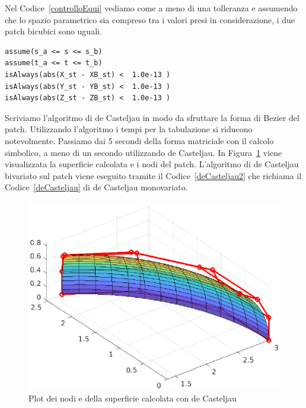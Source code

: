 \documentclass[12pt]{article}
\begin{document}
Nel Codice~\ref{controlloEqui} vediamo come a meno di una tolleranza e assumendo che lo spazio
parametrico sia compreso tra i valori presi in considerazione, i due patch bicubici sono uguali.
\begin{lstlisting}[caption={Controllo di equivalenza tra i due patch}, style=matlab, label={controlloEqui}, captionpos=b]
assume(s_a <= s <= s_b)
assume(t_a <= t <= t_b)
isAlways(abs(X_st - XB_st) <  1.0e-13 )
isAlways(abs(Y_st - YB_st) <  1.0e-13 )
isAlways(abs(Z_st - ZB_st) <  1.0e-13 )
\end{lstlisting}
Scriviamo l'algoritmo di de Casteljau in modo da sfruttare la forma di Bezier del patch. 
Utilizzando l'algoritmo i tempi per la tabulazione si riducono notevolmente. 
Passiamo dai 5 secondi della forma matriciale con il calcolo simbolico, a meno di un secondo
utilizzando de Casteljau. In Figura~\ref{fig:5} viene visualizzata la superficie calcolata
e i nodi del patch. L'algoritmo di de Casteljau bivariato sul patch viene eseguito tramite il 
Codice~\ref{deCasteljau2} che richiama il Codice~\ref{deCasteljau} di de Casteljau monovariato.
\begin{figure}[H]
    \centering

    \includegraphics[scale=0.7]{img/deCasteljauPatch.eps}

    \caption{Plot dei nodi e della superficie calcolata con de Casteljau}\label{fig:5}
\end{figure}



\end{document}

